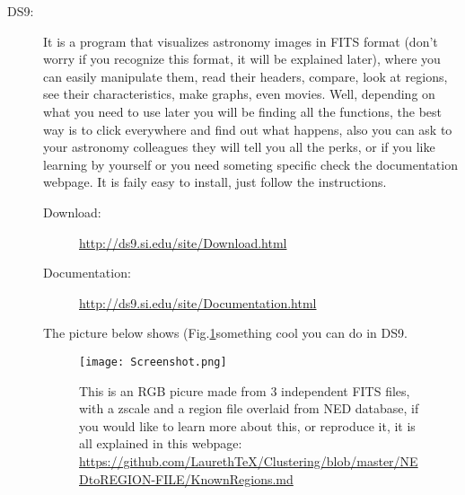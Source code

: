 \documentclass[11pt,fleqn]{book} %
\begin{document}
																																																																							\begin{description}
																																																																								\item[DS9:] It is a program that visualizes astronomy images in FITS format (don't worry if you recognize this format, it will be explained later), where you can easily manipulate them, read their headers, compare, look at regions, see their characteristics, make graphs, even movies. Well, depending on what you need to use later you will be finding all the functions, the best way is to click everywhere and find out what happens, also you can ask to your astronomy colleagues they will tell you all the perks, or if you like learning by yourself or you need someting specific check the documentation webpage. It is faily easy to install, just follow the instructions.
																																																																								    	\begin{description}
																																																																									        	\item[Download: ]\url{http://ds9.si.edu/site/Download.html}
																																																																											            \item[Documentation: ]\url{http://ds9.si.edu/site/Documentation.html}
																																																																												            \end{description}
																																																																													            The picture below shows (Fig.\ref{fig:screen}something cool you can do in DS9.
																																																																														            \begin{figure}[h]
																																																																															            	\centering
																																																																																	    \texttt{[image: Screenshot.png]}
																																																																																	        \caption{This is an RGB picure made from 3 independent FITS files, with a zscale and a region file overlaid from NED database, if you would like to learn more about this, or reproduce it, it is all explained in this webpage: \url{https://github.com/LaurethTeX/Clustering/blob/master/NEDtoREGION-FILE/KnownRegions.md}}
																																																																																		    \label{fig:screen}
																																																																																		            \end{figure}
																																																																																			            

\end{description}
\end{document}
